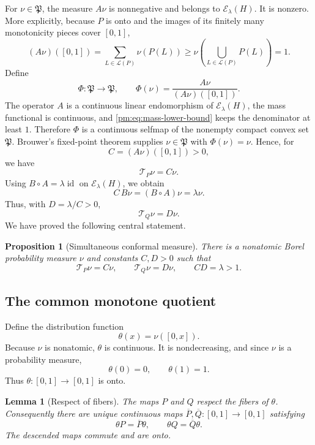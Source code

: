 \documentclass[11pt]{article}
\newtheorem{lemma}[theorem]{Lemma}
\newtheorem{proposition}[theorem]{Proposition}
\theoremstyle{definition}
\theoremstyle{remark}
\newcommand{\I}{[0,1]}
\newcommand{\id}{\operatorname{id}}
\newcommand{\T}{\mathcal T}
\newcommand{\Lap}{\mathscr L}
\begin{document}
For $\nu\in\mathfrak P$, the measure $A\nu$ is nonnegative and belongs to
$\mathscr E_\lambda(H)$.  It is nonzero.  More explicitly, because $P$ is
onto and the images of its finitely many monotonicity pieces cover $\I$,
\begin{equation}\label{pm:eq:mass-lower-bound}
 (A\nu)(\I)
 =\sum_{L\in\Lap(P)}\nu(P(L))
 \geq \nu\left(\bigcup_{L\in\Lap(P)}P(L)\right)
 =1.
\end{equation}
Define
\[
 \Phi:\mathfrak P\longrightarrow\mathfrak P,
 \qquad
 \Phi(\nu)=\frac{A\nu}{(A\nu)(\I)}.
\]
The operator $A$ is a continuous linear endomorphism of
$\mathscr E_\lambda(H)$, the mass functional is continuous, and
\eqref{pm:eq:mass-lower-bound} keeps the denominator at least $1$.
Therefore $\Phi$ is a continuous selfmap of the nonempty compact convex set
$\mathfrak P$.  Brouwer's fixed-point theorem supplies
$\nu\in\mathfrak P$ with $\Phi(\nu)=\nu$.  Hence, for
\[
 C=(A\nu)(\I)>0,
\]
we have
\begin{equation}\label{pm:eq:P-eigenmeasure}
 \T_P\nu=C\nu.
\end{equation}
Using $B\circ A=\lambda\id$ on $\mathscr E_\lambda(H)$, we obtain
\[
 C\,B\nu=(B\circ A)\nu=\lambda\nu.
\]
Thus, with $D=\lambda/C>0$,
\begin{equation}\label{pm:eq:Q-eigenmeasure}
 \T_Q\nu=D\nu.
\end{equation}
We have proved the following central statement.

\begin{proposition}[Simultaneous conformal measure]
\label{pm:prop:simultaneous-measure}
There is a nonatomic Borel probability measure $\nu$ and constants
$C,D>0$ such that
\[
 \T_P\nu=C\nu,\qquad
 \T_Q\nu=D\nu,\qquad
 CD=\lambda>1.
\]
\end{proposition}

\subsection{The common monotone quotient}

Define the distribution function
\begin{equation}\label{pm:eq:theta}
 \theta(x)=\nu([0,x]).
\end{equation}
Because $\nu$ is nonatomic, $\theta$ is continuous.  It is nondecreasing,
and since $\nu$ is a probability measure,
\[
 \theta(0)=0,\qquad \theta(1)=1.
\]
Thus $\theta:\I\to\I$ is onto.

\begin{lemma}[Respect of fibers]\label{pm:lem:fibers}
The maps $P$ and $Q$ respect the fibers of $\theta$.  Consequently there
are unique continuous maps $\overline P,\overline Q:\I\to\I$ satisfying
\begin{equation}\label{pm:eq:factor-identities}
 \theta P=\overline P\theta,
 \qquad
 \theta Q=\overline Q\theta.
\end{equation}
The descended maps commute and are onto.
\end{lemma}
\end{document}
